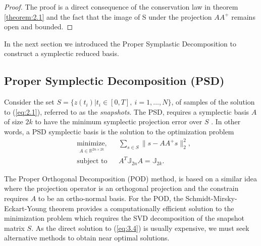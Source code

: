\begin{proof}
The proof is a direct consequence of the conservation law in theorem \ref{theorem:2.1} and the fact that the image of S under the projection $AA^+$ remains open and bounded.
\end{proof}


In the next section we introduced the Proper Symplastic Decomposition to construct a symplectic reduced basis.

\subsection{Proper Symplectic Decomposition (PSD)} \label{sec:3.2} Consider the set $S = \{z(t_i)| t_i\in[0,T],\ i=1,\dots,N\}$, of samples of the solution to (\ref{eq:2.1}), referred to as the \emph{snapshots}. The PSD, requires a symplectic basis $A$ of size $2k$ to have the minimum symplectic projection error over $S$ . In other words, a PSD symplectic basis is the solution to the optimization problem
\begin{equation} \label{eq:3.4}
	\begin{aligned}
	& \underset{A \in \mathbb R^{2n\times 2k}}{\text{minimize}, }
	& & \sum_{s\in S} \| s - AA^+s\|_2^2, \\
	& \text{subject to}
	& & A^T \mathbb{J}_{2n}A = \mathbb{J}_{2k}.
	\end{aligned}
\end{equation}

The Proper Orthogonal Decomposition (POD) \cite{hesthaven2015certified,quarteroni2015reduced} method, is based on a similar idea where the projection operator is an orthogonal projection and the constrain requires $A$ to be an ortho-normal basis. For the POD, the Schmidt-Mirsky-Eckart-Young theorem \cite{Markovsky:2011:LRA:2103589} provides a computationally efficient solution to the minimization problem which requires the SVD decomposition of the snapshot matrix $S$. As the direct solution to (\ref{eq:3.4}) is usually expensive, we must seek alternative methods to obtain near optimal solutions.

